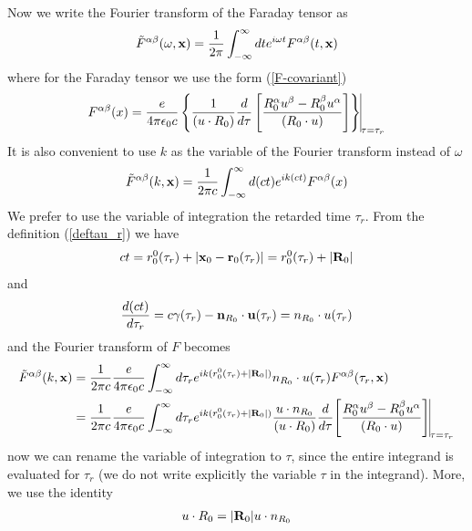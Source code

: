Now we write the Fourier transform of the Faraday tensor as
\begin{align}
    \tilde F^{\alpha\beta}(\omega,{\bf x})=\frac1{2\pi}\int_{-\infty}^{\infty}dt e^{i\omega t}F^{\alpha\beta}(t,{\bf x})
\end{align}
where for the Faraday tensor we use the form (\ref{F-covariant})
\begin{align}
    F^{\alpha\beta}(x)={\frac{e}{4\pi\epsilon_0c}\left\{\frac1{(u\cdot R_0)}\frac{d}{d\tau}\left[\frac{R_0^{\alpha}u^{\beta}-R_0^{\beta}u^{\alpha}}{(R_0\cdot u)}\right]\right\}\vline}_{\tau=\tau_r}\label{F-covariant}
\end{align}
It is also convenient to use $k$ as the variable of the Fourier transform instead of $\omega$
\begin{align}
    \tilde F^{\alpha\beta}(k,{\bf x})=\frac1{2\pi c}\int_{-\infty}^{\infty}d(ct) e^{ik (ct)}F^{\alpha\beta}(x)
\end{align}
We prefer to use the variable of integration the retarded time $\tau_r$. From the definition (\ref{deftau_r}) we have
\begin{align}
    ct = r_0^0(\tau_r)+|{\bf x}_0 -{\bf r}_0(\tau_r)| = r_0^0(\tau_r)+|{\bf R}_0|
\end{align}
and
\begin{align}
    \frac{d(ct)}{d\tau_r} = c\gamma(\tau_r) - {\bf n}_{R_0}\cdot{\bf u}(\tau_r) = n_{R_0}\cdot u(\tau_r)
\end{align}
and the Fourier transform of $F$ becomes
\begin{align}
    \tilde F^{\alpha\beta}(k,{\bf x}) & =\frac1{2\pi c}\frac{e}{4\pi\epsilon_0c}\int_{-\infty}^{\infty}d\tau_r e^{ik (r_0^0(\tau_r) + |{\bf R}_0|)}n_{R_0}\cdot u(\tau_r)F^{\alpha\beta}(\tau_r,{\bf x})\nonumber                                                                                  \\
                                      & =\frac1{2\pi c}\frac{e}{4\pi\epsilon_0c}\int_{-\infty}^{\infty}d\tau_r e^{ik (r_0^0(\tau_r) + |{\bf R}_0|)}\frac{u\cdot n_{R_0}}{(u\cdot R_0)}\frac{d}{d\tau}{\left[\frac{R_0^\alpha u^\beta-R_0^\beta u^\alpha}{(R_0\cdot u)}\right]\vline}_{\tau=\tau_r}
\end{align}
now we can rename the variable of integration to $\tau$, since the entire integrand is evaluated for $\tau_r$ (we do not write explicitly the variable $\tau$ in the integrand). More, we use the identity
\begin{align}
    u\cdot R_0 = |{\bf R}_0| u\cdot n_{R_0}
\end{align}
